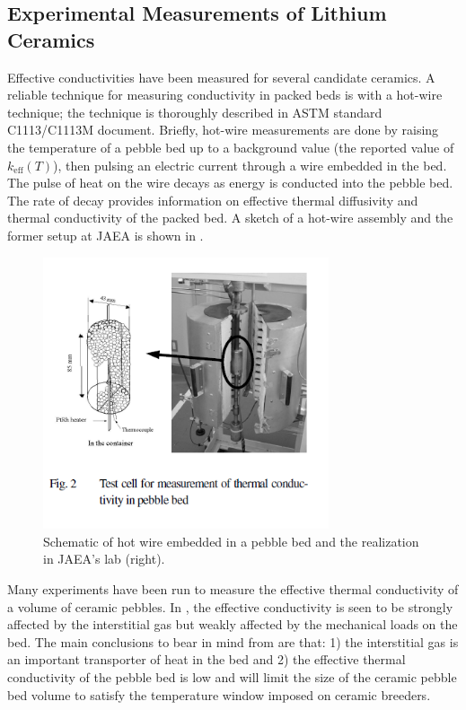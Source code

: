\documentclass[11pt]{report} %
\begin{document}
\subsection{Experimental Measurements of Lithium Ceramics}
Effective conductivities have been measured for several candidate ceramics. A reliable technique for measuring conductivity in packed beds is with a hot-wire technique; the technique is thoroughly described in ASTM standard C1113/C1113M document. Briefly, hot-wire measurements are done by raising the temperature of a pebble bed up to a background value (the reported value of $k_\text{eff}(T)$), then pulsing an electric current through a wire embedded in the bed. The pulse of heat on the wire decays as energy is conducted into the pebble bed. The rate of decay provides information on effective thermal diffusivity and thermal conductivity of the packed bed. A sketch of a hot-wire assembly and the former setup at JAEA is shown in .

\begin{figure}[h]
	\centering
	\includegraphics[trim={0cm 2cm 0cm 0cm},clip, width=0.75\textwidth]{images/HWT} 
	\caption{Schematic of hot wire embedded in a pebble bed and the realization in JAEA's lab (right).}
	\label{fig:HWT}
\end{figure}

Many experiments have been run to measure the effective thermal conductivity of a volume of ceramic pebbles. In , the effective conductivity is seen to be strongly affected by the interstitial gas but weakly affected by the mechanical loads on the bed. The main conclusions to bear in mind from  are that: 1) the interstitial gas is an important transporter of heat in the bed and 2) the effective thermal conductivity of the pebble bed is low and will limit the size of the ceramic pebble bed volume to satisfy the temperature window imposed on ceramic breeders.
\end{document}
